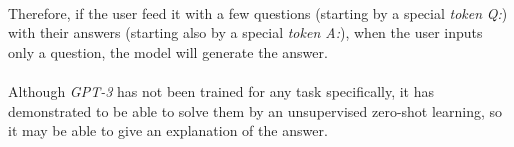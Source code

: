 \paragraph{}
Therefore, if the user feed it with a few questions (starting by a special \emph{token} \emph{Q:}) with their answers (starting also by a special \emph{token A:}), when the user inputs only a question, the model will generate the answer.
\paragraph{}
Although \emph{GPT-3} has not been trained for any task specifically, it has demonstrated to be able to solve them by an unsupervised zero-shot learning, so it may be able to give an explanation of the answer. 